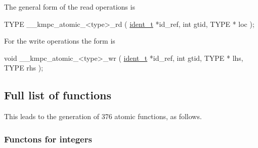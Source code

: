 The general form of the read operations is 
\begin{DoxyCode}
TYPE \_\_kmpc\_atomic\_<type>\_rd ( \hyperlink{structident}{ident\_t} *id\_ref, \textcolor{keywordtype}{int} gtid, TYPE * loc );
\end{DoxyCode}


For the write operations the form is 
\begin{DoxyCode}
\textcolor{keywordtype}{void} \_\_kmpc\_atomic\_<type>\_wr ( \hyperlink{structident}{ident\_t} *id\_ref, \textcolor{keywordtype}{int} gtid, TYPE * lhs, TYPE rhs );
\end{DoxyCode}


\subsection*{Full list of functions }

This leads to the generation of 376 atomic functions, as follows.

\subsubsection*{Functons for integers }

